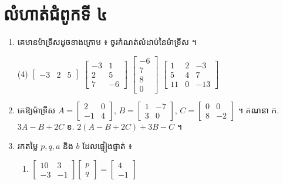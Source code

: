\section*{លំហាត់ជំពូកទី ៤}
\begin{enumerate}[1]
  \item គេមានម៉ាទ្រីសដូចខាងក្រោម ៖ ចូរកំណត់លំដាប់នៃម៉ាទ្រីស ។
  \begin{tasks}(4)
    \task $\begin{bmatrix} -3 & 2 & 5 \end{bmatrix}$
    \task $\begin{bmatrix} -3 & 1\\ 2 & 5\\ 7 & -6 \end{bmatrix}$
    \task $\begin{bmatrix} -6\\ 7\\ 8\\ 0 \end{bmatrix}$
    \task $\begin{bmatrix} 1 & 2 & -3\\ 5 & 4 & 7\\ 11 & 0 & -13 \end{bmatrix}$
  \end{tasks}
  \item គេឱ្យម៉ាទ្រីស $A = \begin{bmatrix} 2 & 0\\ -1 & 4 \end{bmatrix}$, $B = \begin{bmatrix} 1 & -7\\ 3 & 0 \end{bmatrix}$, $C = \begin{bmatrix} 0 & 0\\ 8 & -2 \end{bmatrix}$ ។ គណនា \quad ក. $3A - B + 2C$ \quad ខ. $2(A - B + 2C) + 3B - C$ ។
  \item រកតម្លៃ $p, q, a$ និង $b$ ដែលផ្ទៀងផ្ទាត់ ៖
  \begin{enumerate}[a]
    \item $\begin{bmatrix} 10 & 3\\ -3 & -1 \end{bmatrix}\begin{bmatrix} p\\ q \end{bmatrix} = \begin{bmatrix} 4\\ -1 \end{bmatrix}$

\end{enumerate}
\end{enumerate}
